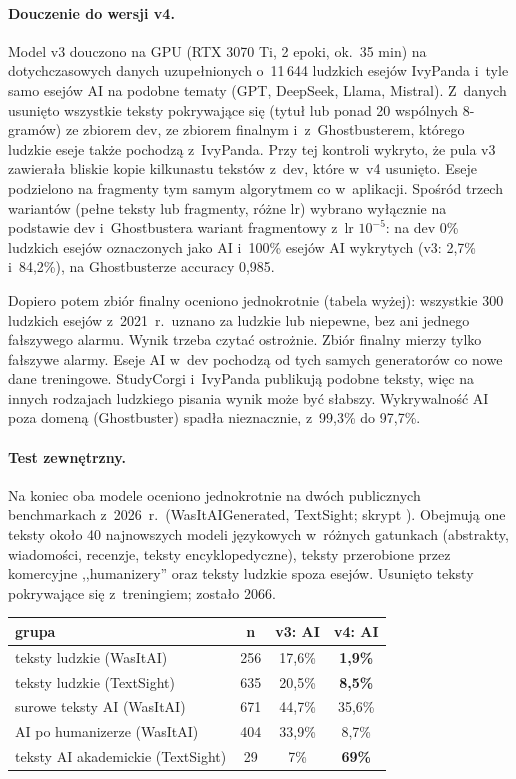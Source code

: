 \paragraph{Douczenie do wersji v4.}
Model v3 douczono na GPU (RTX 3070 Ti, 2 epoki, ok.\ 35 min) na dotychczasowych
danych uzupełnionych o~11\,644 ludzkich esejów IvyPanda i~tyle samo esejów AI na
podobne tematy (GPT, DeepSeek, Llama, Mistral). Z~danych usunięto wszystkie teksty
pokrywające się (tytuł lub ponad 20 wspólnych 8-gramów) ze zbiorem dev, ze zbiorem
finalnym i~z~Ghostbusterem, którego ludzkie eseje także pochodzą z~IvyPanda.
Przy tej kontroli wykryto, że pula v3 zawierała bliskie kopie kilkunastu tekstów
z~dev, które w~v4 usunięto. Eseje podzielono na fragmenty tym samym algorytmem co
w~aplikacji. Spośród trzech wariantów (pełne teksty lub fragmenty, różne lr)
wybrano wyłącznie na podstawie dev i~Ghostbustera wariant fragmentowy z~lr
\(10^{-5}\): na dev 0\% ludzkich esejów oznaczonych jako AI i~100\% esejów AI
wykrytych (v3: 2,7\% i~84,2\%), na Ghostbusterze accuracy 0,985.

Dopiero potem zbiór finalny oceniono jednokrotnie (tabela wyżej): wszystkie 300
ludzkich esejów z~2021~r.\ uznano za ludzkie lub niepewne, bez ani jednego
fałszywego alarmu. Wynik trzeba czytać ostrożnie. Zbiór finalny mierzy tylko
fałszywe alarmy. Eseje AI w~dev pochodzą od tych samych generatorów co nowe dane
treningowe. StudyCorgi i~IvyPanda publikują podobne teksty, więc na innych
rodzajach ludzkiego pisania wynik może być słabszy. Wykrywalność AI poza domeną
(Ghostbuster) spadła nieznacznie, z~99,3\% do 97,7\%.

\paragraph{Test zewnętrzny.}
Na koniec oba modele oceniono jednokrotnie na dwóch publicznych benchmarkach z~2026~r.\
(WasItAIGenerated, TextSight; skrypt ). Obejmują one teksty
około 40 najnowszych modeli językowych w~różnych gatunkach (abstrakty, wiadomości,
recenzje, teksty encyklopedyczne), teksty przerobione przez komercyjne ,,humanizery''
oraz teksty ludzkie spoza esejów. Usunięto teksty pokrywające się z~treningiem; zostało 2066.

\begin{center}
\small
\begin{tabular}{|l|c|c|c|}
\hline
grupa & n & v3: AI & v4: AI \\
\hline
teksty ludzkie (WasItAI) & 256 & 17,6\% & \textbf{1,9\%} \\
teksty ludzkie (TextSight) & 635 & 20,5\% & \textbf{8,5\%} \\
surowe teksty AI (WasItAI) & 671 & 44,7\% & 35,6\% \\
AI po humanizerze (WasItAI) & 404 & 33,9\% & 8,7\% \\
teksty AI akademickie (TextSight) & 29 & 7\% & \textbf{69\%} \\
\hline
\end{tabular}
\end{center}

